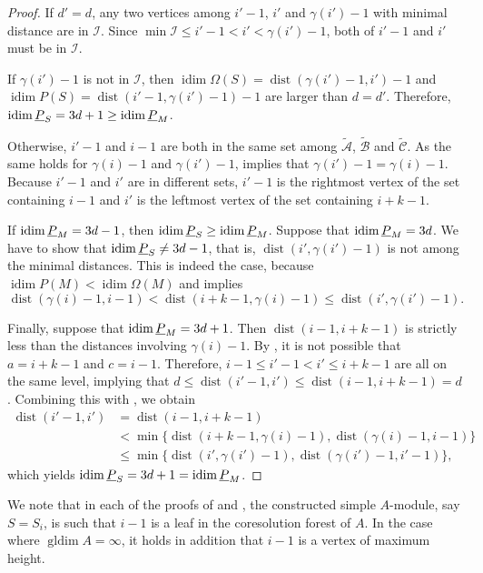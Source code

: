 \documentclass[a4paper]{amsart}
\theoremstyle{definition}
\theoremstyle{remark}
\numberwithin{equation}{theorem}
\newcommand{\idim}{\operatorname{idim}}
\newcommand{\gldim}{\operatorname{gldim}}
\newcommand{\dist}{\operatorname{dist}}
\begin{document}
\begin{proof}
    If $d'=d$, any
    two vertices among $i'-1$, $i'$ and $\gamma(i')-1$ with minimal distance are in $\mathcal I$.  Since $\min\mathcal I\leq i'-1 < i' < \gamma(i')-1$, both of $ i'-1 $ and $ i' $ must be in $ \mathcal I $.

    If $\gamma(i')-1$ is
    not in $\mathcal I$, then $\idim\Omega(S) = \dist(\gamma(i')-1, i')-1$ and
    $\idim P(S)=\dist(i'-1,\gamma(i')-1)-1$ are larger than $ d = d' $. Therefore,
    $\stabidim[S]=3d+1\geq\stabidim$.

    Otherwise, $i'-1$ and $i-1$ are both in the same set among
    $ \tilde{\mathcal A} $, $ \tilde{\mathcal B} $ and $ \tilde{\mathcal C} $. As the same holds for $ \gamma(i)-1 $ and $ \gamma(i')-1 $,  implies that
    $\gamma(i')-1 = \gamma(i)-1$.  Because $i'-1$ and $i'$ are in
    different sets, $i'-1$ is the rightmost vertex of the set
    containing $i-1$ and $i'$ is the leftmost vertex of the set
    containing $i+k-1$.

    If $\stabidim=3d-1$, then $\stabidim[S]\geq\stabidim$.  Suppose
    that $\stabidim=3d$.  We have to show that
    $\stabidim[S]\neq 3d-1$, that is, $\dist(i', \gamma(i')-1)$ is
    not among the minimal distances.  This is indeed the case,
    because $\idim P(M)<\idim\Omega(M)$ and
     implies
    \[
      \dist(\gamma(i)-1, i-1) <
      \dist(i+k-1,\gamma(i)-1)\leq\dist(i',\gamma(i')-1).
    \]

    Finally, suppose that $\stabidim = 3d+1$.  Then
    $\dist(i-1, i+k-1)$ is strictly less than the distances involving
    $\gamma(i)-1$.  By , it is not
    possible that $a=i+k-1$ and $c=i-1$.  Therefore, $ i-1 \leq i'-1 < i' \leq i+k-1 $ are all on the same level, implying that
    $ d \leq \dist(i'-1, i')\leq\dist(i-1, i+k-1) = d $.
    Combining this with
    , we obtain
    \begin{align*}
      \dist(i'-1, i')& = \dist(i-1, i+k-1)\\
                     &<\min\{\dist(i+k-1,\gamma(i)-1),\dist(\gamma(i)-1, i-1)\}\\
                     &\leq\min\{\dist(i',\gamma(i')-1),\dist(\gamma(i')-1, i'-1)\},
    \end{align*}
    which yields $ \stabidim[S] = 3d+1 = \stabidim $.
\end{proof}


   We note that in each of the proofs of  and , the constructed simple $A$-module, say $S = S_i$, is such that $i-1$ is a leaf in the coresolution forest of $A$. In the case where $ \gldim A = \infty $, it holds in addition that $ i-1 $ is a vertex of maximum height.
    
\end{document}
